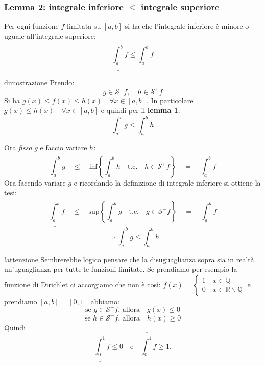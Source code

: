 \documentclass[x11names]{article}
\begin{document}
	\begin{center}
		\colorbox{myred}{\begin{minipage}{5.75in}
				\begin{redes}{}
					\subsubsection{Lemma 2: integrale inferiore $\leq$ integrale superiore}
					Per ogni funzione $f$ limitata su $\left[a,b\right]$ si ha che l'integrale inferiore è minore o uguale all'integrale superiore:
					\[
					\underline{\int_{a}^{b}}f \leq \overline{\int_{a}^{b}}f
					\]
				\end{redes}
		\end{minipage}}        
	\end{center}
	\begin{es}{dimostrazione}
		Prendo:
		\[
		g \in \mathcal{S}^-f, \quad h \in \mathcal{S}^+f
		\]
		Si ha $g(x) \leq f(x) \leq h(x) \quad \forall x \in [a,b]$. In particolare $g(x) \leq h(x) \quad \forall x \in [a,b]$ e quindi per il \textbf{lemma 1}:
		\[
		\int_{a}^{b}g \leq \int_{a}^{b}h 
		\]
		
		Ora \textit{fisso} $g$ e faccio variare $h$:
		\[
		\int_{a}^{b}g \quad \leq \quad \text{inf}\left\{\int_{a}^{b}h \quad \text{t.c.} \quad h \in \mathcal{S}^+f\right\} \quad = \quad \overline{\int_{a}^{b}}f
		\]
		Ora facendo variare $g$ e ricordando la definizione di integrale inferiore si ottiene la tesi:
		\[
		\underline{\int_{a}^{b}}f \quad \leq \quad \text{sup}\left\{\int_{a}^{b}g \quad \text{t.c.} \quad g \in \mathcal{S}^-f\right\} \quad = \quad \overline{\int_{a}^{b}}f
		\]
		\[
		\Longrightarrow 	\int_{a}^{b}g \leq \int_{a}^{b}h 
		\]
		\begin{es}{!attenzione}
			Sembrerebbe logico pensare che la disuguaglianza sopra sia in realtà un'uguaglianza per tutte le funzioni limitate.
			Se prendiamo per esempio la funzione di Dirichlet ci accorgiamo che non è così: $f(x) = \begin{cases}
				1 \quad x \in \mathbb{Q} \\
				0 \quad x \in \mathbb{R} \backslash \mathbb{Q}
			\end{cases}$
			e prendiamo $[a,b] = [0,1]$ abbiamo:
			\[
			\text{se } g \in \mathcal{S}^-f \text{, allora} \quad g(x) \leq 0
			\]
			\[
			\text{se } h \in \mathcal{S}^+f \text{, allora} \quad h(x) \geq 0
			\]
			Quindi 
			\[
			\underline{\int_{0}^{1}}f \leq 0 \quad \text{e} \quad \overline{\int_{0}^{1}}f \geq 1.
			\]
		\end{es}
	\end{es}
	
\end{document}
